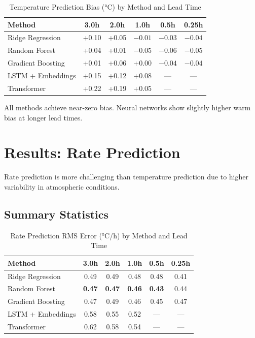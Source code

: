 \documentclass[11pt,letterpaper]{article}
\begin{document}
\begin{table}[H]
\centering
\caption{Temperature Prediction Bias (°C) by Method and Lead Time}
\label{tab:temp_bias}
\begin{tabular}{l|ccccc}
\toprule
\textbf{Method} & \textbf{3.0h} & \textbf{2.0h} & \textbf{1.0h} & \textbf{0.5h} & \textbf{0.25h} \\
\midrule
Ridge Regression & +0.10 & +0.05 & $-0.01$ & $-0.03$ & $-0.04$ \\
Random Forest & +0.04 & +0.01 & $-0.05$ & $-0.06$ & $-0.05$ \\
Gradient Boosting & +0.01 & +0.06 & +0.00 & $-0.04$ & $-0.04$ \\
\midrule
LSTM + Embeddings & +0.15 & +0.12 & +0.08 & --- & --- \\
Transformer & +0.22 & +0.19 & +0.05 & --- & --- \\
\bottomrule
\end{tabular}
\end{table}

All methods achieve near-zero bias. Neural networks show slightly higher warm bias at longer lead times.

\section{Results: Rate Prediction}

Rate prediction is more challenging than temperature prediction due to higher variability in atmospheric conditions.

\subsection{Summary Statistics}

\begin{table}[H]
\centering
\caption{Rate Prediction RMS Error (°C/h) by Method and Lead Time}
\label{tab:rate_results}
\begin{tabular}{l|ccccc}
\toprule
\textbf{Method} & \textbf{3.0h} & \textbf{2.0h} & \textbf{1.0h} & \textbf{0.5h} & \textbf{0.25h} \\
\midrule
Ridge Regression & 0.49 & 0.49 & 0.48 & 0.48 & 0.41 \\
\rowcolor{bestcolor} Random Forest & \textbf{0.47} & \textbf{0.47} & \textbf{0.46} & \textbf{0.43} & 0.44 \\
Gradient Boosting & 0.47 & 0.49 & 0.46 & 0.45 & 0.47 \\
\midrule
LSTM + Embeddings & 0.58 & 0.55 & 0.52 & --- & --- \\
Transformer & 0.62 & 0.58 & 0.54 & --- & --- \\
\bottomrule
\end{tabular}
\end{table}
\end{document}
